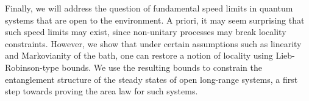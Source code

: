 Finally, we will address the question of fundamental speed limits in quantum systems that are open to the environment. A priori, it may seem surprising that such speed limits may exist, since non-unitary processes may break locality constraints. However, we show that under certain assumptions such as linearity and Markovianity of the bath, one can restore a notion of locality using Lieb-Robinson-type bounds. We use the resulting bounds to constrain the entanglement structure of the steady states of open long-range systems, a first step towards proving the area law for such systems.
